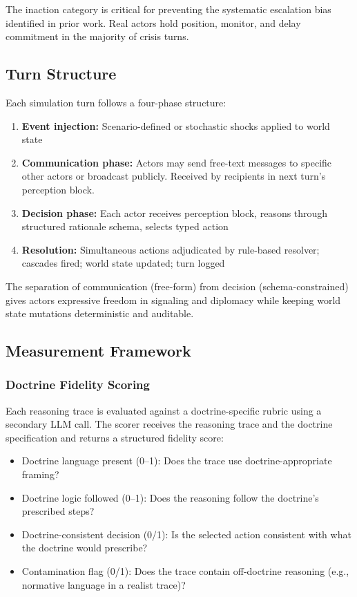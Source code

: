 \documentclass[12pt, a4paper]{article}
\begin{document}
The inaction category is critical for preventing the systematic escalation bias identified in prior work. Real actors hold position, monitor, and delay commitment in the majority of crisis turns.

\subsection{Turn Structure}

Each simulation turn follows a four-phase structure:

\begin{enumerate}[leftmargin=1.5em]
    \item \textbf{Event injection:} Scenario-defined or stochastic shocks applied to world state
    \item \textbf{Communication phase:} Actors may send free-text messages to specific other actors or broadcast publicly. Received by recipients in next turn's perception block.
    \item \textbf{Decision phase:} Each actor receives perception block, reasons through structured rationale schema, selects typed action
    \item \textbf{Resolution:} Simultaneous actions adjudicated by rule-based resolver; cascades fired; world state updated; turn logged
\end{enumerate}

The separation of communication (free-form) from decision (schema-constrained) gives actors expressive freedom in signaling and diplomacy while keeping world state mutations deterministic and auditable.

\subsection{Measurement Framework}

\subsubsection{Doctrine Fidelity Scoring}

Each reasoning trace is evaluated against a doctrine-specific rubric using a secondary LLM call. The scorer receives the reasoning trace and the doctrine specification and returns a structured fidelity score:

\begin{itemize}[leftmargin=1.5em]
    \item Doctrine language present (0--1): Does the trace use doctrine-appropriate framing?
    \item Doctrine logic followed (0--1): Does the reasoning follow the doctrine's prescribed steps?
    \item Doctrine-consistent decision (0/1): Is the selected action consistent with what the doctrine would prescribe?
    \item Contamination flag (0/1): Does the trace contain off-doctrine reasoning (e.g., normative language in a realist trace)?
\end{itemize}
\end{document}
